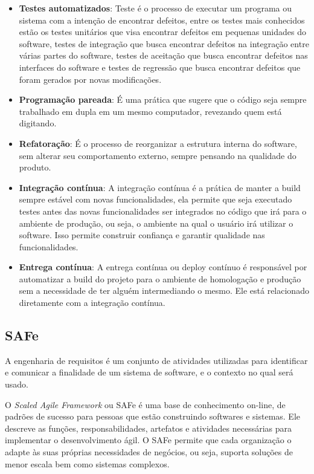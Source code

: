 \begin{itemize}
  \item \textbf{Testes automatizados}: Teste é o processo de executar um programa ou sistema com a intenção de encontrar defeitos, entre os testes mais conhecidos estão os testes unitários que visa encontrar defeitos em pequenas unidades do software, testes de integração que busca encontrar defeitos na integração entre várias partes do software, testes de aceitação que busca encontrar defeitos nas interfaces do software e testes de regressão que busca encontrar defeitos que foram gerados por novas modificações.
  \item \textbf{Programação pareada}: É uma prática que sugere que o código seja sempre trabalhado em dupla em um mesmo computador, revezando quem está digitando.
  \item \textbf{Refatoração}: É o processo de reorganizar a estrutura interna do software, sem alterar seu comportamento externo, sempre pensando na qualidade do produto.
  \item \textbf{Integração contínua}: A integração contínua é a prática de manter a build sempre estável com novas funcionalidades, ela permite que seja executado testes antes das novas funcionalidades ser integrados no código que irá para o ambiente de produção, ou seja, o ambiente na qual o usuário irá utilizar o software. Isso permite construir confiança e garantir qualidade nas funcionalidades.
  \item \textbf{Entrega contínua}:  A entrega contínua ou deploy contínuo é responsável por automatizar a build do projeto para o ambiente de homologação e produção sem a necessidade de ter alguém intermediando o mesmo. Ele está relacionado diretamente com a integração contínua.
\end{itemize}

\subsection{SAFe}

A engenharia de requisitos é um conjunto de atividades utilizadas para identificar e comunicar a finalidade de um
sistema de software, e o contexto no qual será usado. \cite{leffingwell}

O \textit{Scaled Agile Framework} ou SAFe é uma base de conhecimento on-line, de padrões de sucesso para pessoas que estão construindo softwares e sistemas. Ele descreve as funções, responsabilidades, artefatos e atividades necessárias para implementar o desenvolvimento ágil. O SAFe permite que cada organização o adapte às suas próprias necessidades de negócios, ou seja, suporta soluções de menor escala bem como sistemas complexos. \cite{safe}

